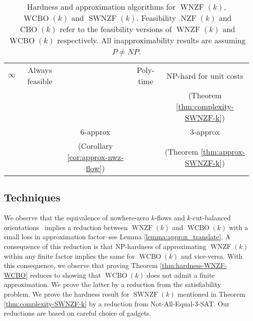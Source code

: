 \documentclass[11pt]{article}
\begin{document}
\begin{table}[htbp]
\begin{center}
\begin{tabular}{|c|c|c|c|c|}
\\ \hline
$\infty$ & Always feasible & & Poly-time & NP-hard for unit costs\\
 & \cite{seymour1981nowhere, younger1983integer}  & & \cite{lucchesi1978minimax,edmonds1977min} & (Theorem \ref{thm:complexity-SWNZF-k}) \\
 & & $6$-approx & & $3$-approx \\
 & & (Corollary \ref{cor:approx-nwz-flow}) & & (Theorem \ref{thm:approx-SWNZF-k})
\\ \hline
\end{tabular}
\caption{Hardness and approximation algorithms for $\operatorname{WNZF}(k)$, $\operatorname{WCBO}(k)$ and $\operatorname{SWNZF}(k)$. 
Feasibility $\operatorname{NZF}(k)$ and $\operatorname{CBO}(k)$ refer to the feasibility versions of $\operatorname{WNZF}(k)$ and $\operatorname{WCBO}(k)$ respectively.
All inapproximability results are assuming $P\neq NP$.}
\label{table:main}
\end{center}
\end{table}

\vspace{-3em}
\subsection{Techniques}
We observe that the equivalence of nowhere-zero $k$-flows and $k$-cut-balanced orientations~\cite{jaeger1976balanced} implies a reduction between $\operatorname{WNZF}(k)$ and $\operatorname{WCBO}(k)$ with a small loss in approximation factor--see Lemma \ref{lemma:approx_translate}. A consequence of this reduction is that NP-hardness of approximating $\operatorname{WNZF}(k)$ within any finite factor implies the same for $\operatorname{WCBO}(k)$ and vice-versa. With this consequence, we observe that proving Theorem \ref{thm:hardness-WNZF-WCBO} reduces to showing that $\operatorname{WCBO}(k)$ does not admit a finite approximation. We prove the latter by a reduction from the satisfiability problem. We prove the hardness result for $\operatorname{SWNZF}(k)$ mentioned in Theorem \ref{thm:complexity-SWNZF-k} by a reduction from Not-All-Equal-3-SAT. Our reductions are based on careful choice of gadgets.  
\end{document}

